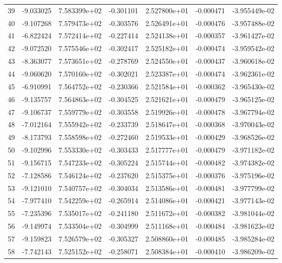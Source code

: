 \begin{tabular}{rrrrrrr}
  39 &  -9.033025 &  7.583399e+02 & -0.301101 &  2.527800e+01 &   -0.000471 & -3.955449e-02 \\
  40 &  -9.107268 &  7.579473e+02 & -0.303576 &  2.526491e+01 &   -0.000476 & -3.957488e-02 \\
  41 &  -6.822424 &  7.572414e+02 & -0.227414 &  2.524138e+01 &   -0.000357 & -3.961427e-02 \\
  42 &  -9.072520 &  7.575546e+02 & -0.302417 &  2.525182e+01 &   -0.000474 & -3.959542e-02 \\
  43 &  -8.363077 &  7.573651e+02 & -0.278769 &  2.524550e+01 &   -0.000437 & -3.960618e-02 \\
  44 &  -9.060620 &  7.570160e+02 & -0.302021 &  2.523387e+01 &   -0.000474 & -3.962361e-02 \\
  45 &  -6.910991 &  7.564752e+02 & -0.230366 &  2.521584e+01 &   -0.000362 & -3.965430e-02 \\
  46 &  -9.135757 &  7.564863e+02 & -0.304525 &  2.521621e+01 &   -0.000479 & -3.965125e-02 \\
  47 &  -9.106737 &  7.559779e+02 & -0.303558 &  2.519926e+01 &   -0.000478 & -3.967794e-02 \\
  48 &  -7.012164 &  7.555942e+02 & -0.233739 &  2.518647e+01 &   -0.000368 & -3.970043e-02 \\
  49 &  -8.173793 &  7.558598e+02 & -0.272460 &  2.519533e+01 &   -0.000429 & -3.968526e-02 \\
  50 &  -9.102996 &  7.553330e+02 & -0.303433 &  2.517777e+01 &   -0.000479 & -3.971182e-02 \\
  51 &  -9.156715 &  7.547233e+02 & -0.305224 &  2.515744e+01 &   -0.000482 & -3.974382e-02 \\
  52 &  -7.128586 &  7.546124e+02 & -0.237620 &  2.515375e+01 &   -0.000376 & -3.975196e-02 \\
  53 &  -9.121010 &  7.540757e+02 & -0.304034 &  2.513586e+01 &   -0.000481 & -3.977799e-02 \\
  54 &  -7.977410 &  7.542259e+02 & -0.265914 &  2.514086e+01 &   -0.000421 & -3.977143e-02 \\
  55 &  -7.235396 &  7.535017e+02 & -0.241180 &  2.511672e+01 &   -0.000382 & -3.981044e-02 \\
  56 &  -9.149974 &  7.533504e+02 & -0.304999 &  2.511168e+01 &   -0.000484 & -3.981623e-02 \\
  57 &  -9.159823 &  7.526579e+02 & -0.305327 &  2.508860e+01 &   -0.000485 & -3.985284e-02 \\
  58 &  -7.742143 &  7.525152e+02 & -0.258071 &  2.508384e+01 &   -0.000410 & -3.986209e-02 \\

\end{tabular}
